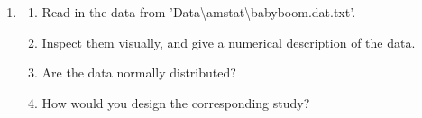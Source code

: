 \begin{enumerate}
  \item
  \begin{enumerate}
    \item Read in the data from 'Data\textbackslash amstat\textbackslash babyboom.dat.txt'.
    \item Inspect them visually, and give a numerical description of the data.
    \item Are the data normally distributed?
    \item How would you design the corresponding study?
  \end{enumerate}

\end{enumerate}


